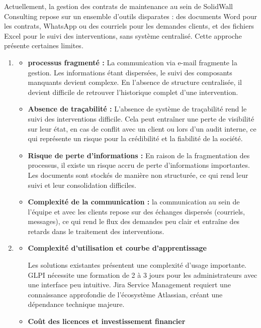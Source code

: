 Actuellement, la gestion des contrats de maintenance au sein de SolidWall Consulting repose sur un ensemble d'outils disparates : des documents Word pour les contrats, WhatsApp ou des courriels pour les demandes clients, et des fichiers Excel pour le suivi des interventions, sans système centralisé. Cette approche présente certaines limites.
\begin{enumerate}[label=\textcolor{bleuPerso}{\alph*)}, labelsep=0.5em]

 \item \noindent{\textbf{\textcolor{bleuPerso}{Limitations du processus actuel }}}
    \begin{itemize}[label=]
    \item \textbf{processus fragmenté : } La communication via e-mail fragmente la gestion. Les informations étant dispersées, le suivi des composants manquants devient complexe.  En l’absence de structure centralisée, il devient difficile de retrouver l'historique complet d'une intervention.
    \item \textbf{Absence de traçabilité :} L'absence de système de traçabilité rend le suivi des interventions difficile. Cela peut entraîner une perte de visibilité sur leur état, en cas de conflit avec un client ou lors d'un audit interne, ce qui représente un risque pour la crédibilité et la fiabilité de la société.
    \item \textbf{Risque de perte d'informations :} En raison de la fragmentation des processus, il existe un risque accru de perte d'informations importantes. Les documents sont stockés de manière non structurée, ce qui rend leur suivi et leur consolidation difficiles.
     \item \textbf{Complexité de la communication : } la communication au sein de l’équipe et avec les clients repose sur des échanges dispersés (courriels, messages), ce qui rend le flux des demandes peu clair et entraîne des retards dans le traitement des interventions.
    
    \end{itemize}

 \item \noindent{\textbf{\textcolor{bleuPerso}{Limitations des solutions existantes }}}
    \begin{itemize}[label=$\bullet$]
    \item \noindent\textbf{Complexité d'utilisation et courbe d'apprentissage}
    
    Les solutions existantes présentent une complexité d'usage importante. GLPI nécessite une formation de 2 à 3 jours pour les administrateurs avec une interface peu intuitive. Jira Service Management requiert une connaissance approfondie de l'écosystème Atlassian, créant une dépendance technique majeure.
    \newpage
    \item \noindent\textbf{Coût des licences et investissement financier}
    

\end{itemize}
\end{enumerate}
